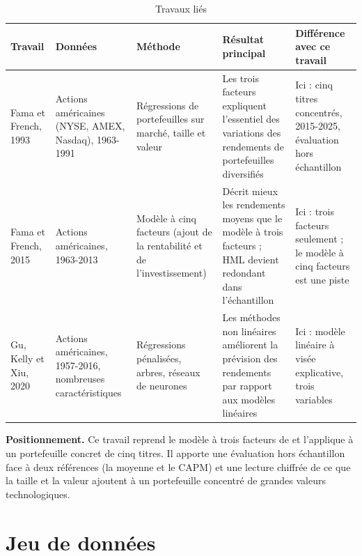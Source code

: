 \documentclass[11pt,a4paper]{article}
\begin{document}
\begin{table}[H]
\centering
\caption{Travaux liés}
\small
\begin{tabularx}{\textwidth}{|p{1.9cm}|p{2.5cm}|p{2.5cm}|X|p{2.8cm}|}
\hline
\textbf{Travail} & \textbf{Données} & \textbf{Méthode} & \textbf{Résultat principal} & \textbf{Différence avec ce travail}\\\hline
Fama et French, 1993 \cite{ff93} & Actions américaines (NYSE, AMEX, Nasdaq), 1963-1991 & Régressions de portefeuilles sur marché, taille et valeur & Les trois facteurs expliquent l'essentiel des variations des rendements de portefeuilles diversifiés & Ici : cinq titres concentrés, 2015-2025, évaluation hors échantillon\\\hline
Fama et French, 2015 \cite{ff15} & Actions américaines, 1963-2013 & Modèle à cinq facteurs (ajout de la rentabilité et de l'investissement) & Décrit mieux les rendements moyens que le modèle à trois facteurs ; HML devient redondant dans l'échantillon & Ici : trois facteurs seulement ; le modèle à cinq facteurs est une piste\\\hline
Gu, Kelly et Xiu, 2020 \cite{gku} & Actions américaines, 1957-2016, nombreuses caractéristiques & Régressions pénalisées, arbres, réseaux de neurones & Les méthodes non linéaires améliorent la prévision des rendements par rapport aux modèles linéaires & Ici : modèle linéaire à visée explicative, trois variables\\\hline
\end{tabularx}
\end{table}

\textbf{Positionnement.} Ce travail reprend le modèle à trois facteurs de \cite{ff93} et l'applique à un portefeuille concret de cinq titres. Il apporte une évaluation hors échantillon face à deux références (la moyenne et le CAPM) et une lecture chiffrée de ce que la taille et la valeur ajoutent à un portefeuille concentré de grandes valeurs technologiques.

\section{Jeu de données}
\end{document}
